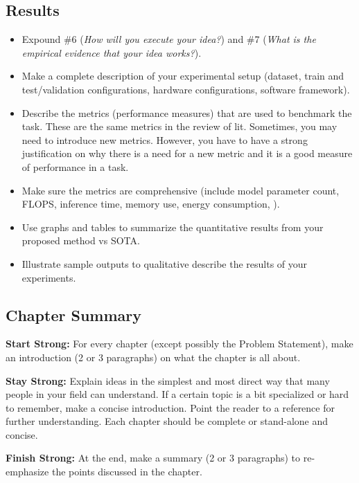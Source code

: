 \begin{singlespace}
    \chapter{Results}
    \label{ch:results}
\end{singlespace}

\begin{itemize}
    \item Expound \#6 (\emph{How will you execute your idea?}) and \#7 (\emph{What is the empirical evidence that your idea works?}).
    \item Make a complete description of your experimental setup (\eg dataset, train and test/validation configurations, hardware configurations, software framework).
    \item Describe the metrics (performance measures) that are used to benchmark the task. These are the same metrics in the review of lit. Sometimes, you may need to introduce new metrics. However, you have to have a strong justification on why there is a need for a new metric and it is a good measure of performance in a task.
    \item Make sure the metrics are comprehensive (\eg include model parameter count, FLOPS, inference time, memory use, energy consumption, \etc).
    \item Use graphs and tables to summarize the quantitative results from your proposed method vs SOTA.
    \item Illustrate sample outputs to qualitative describe the results of your experiments.
\end{itemize}

\section{Chapter Summary}

\textbf{Start Strong:} For every chapter (except possibly the Problem Statement), make an introduction (2 or 3 paragraphs) on what the chapter is all about.

\textbf{Stay Strong:} Explain ideas in the simplest and most direct way that many people in your field can understand. If a certain topic is a bit specialized or hard to remember, make a concise introduction. Point the reader to a reference for further understanding. Each chapter should be complete or stand-alone and concise.

\textbf{Finish Strong:} At the end, make a summary (2 or 3 paragraphs) to re-emphasize the points discussed in the chapter.
